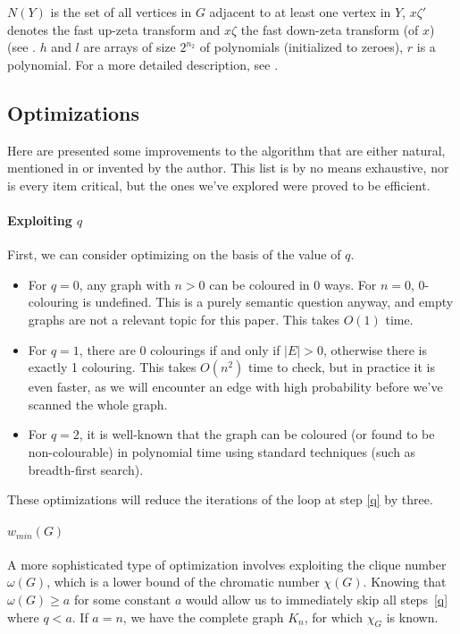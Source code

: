 \documentclass[a4paper]{article}
\begin{document}
$N(Y)$ is the set of all vertices in $G$ adjacent to at least one vertex in $Y$, $x\zeta'$ denotes the fast up-zeta transform and $x\zeta$ the fast down-zeta transform (of $x$) (see \cite[sec 2]{cov_pack}. $h$ and $l$ are arrays of size $2^{n_2}$ of polynomials (initialized to zeroes), $r$ is a polynomial. For a more detailed description, see \cite[p 9]{cov_pack}.

\subsection{Optimizations}\label{opts}
Here are presented some improvements to the algorithm that are either natural, mentioned in \cite{cov_pack} or invented by the author. This list is by no means exhaustive, nor is every item critical, but the ones we've explored were proved to be efficient.

\paragraph{Exploiting $q$}
First, we can consider optimizing on the basis of the value of $q$.
\begin{itemize}
\item For $q = 0$, any graph with $n > 0$ can be coloured in 0 ways. For $n = 0$, 0-colouring is undefined. This is a purely semantic question anyway, and empty graphs are not a relevant topic for this paper. This takes $O(1)$ time.
\item For $q = 1$, there are 0 colourings if and only if $|E| > 0$, otherwise there is exactly 1 colouring. This takes $O(n^2)$ time to check, but in practice it is even faster, as we will encounter an edge with high probability before we've scanned the whole graph.
\item For $q = 2$, it is well-known that the graph can be coloured (or found to be non-colourable) in polynomial time using standard techniques (such as breadth-first search).
\end{itemize}

These optimizations will reduce the iterations of the loop at step \ref{q} by three.

\paragraph{$w_{min}(G)$}
A more sophisticated type of optimization involves exploiting the clique number $\omega(G)$, which is a lower bound of the chromatic number $\chi(G)$. Knowing that $\omega(G) \geq a$ for some constant $a$ would allow us to immediately skip all steps~\ref{q} where $q < a$. If $a = n$, we have the complete graph $K_n$, for which $\chi_G$ is known.
\end{document}
